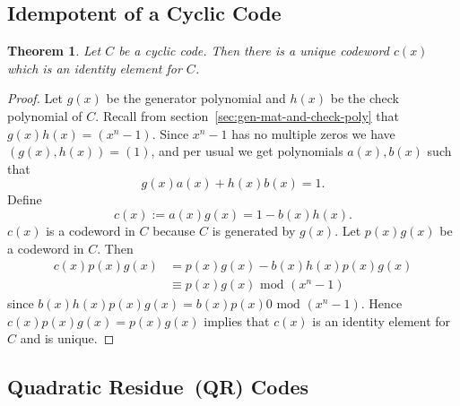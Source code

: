 \documentclass{article}
\renewcommand{\mod}{\text{ mod }}
\renewcommand{\=}{\equiv}
\theoremstyle{plain}
\newtheorem{thm}{Theorem}[subsection]
\theoremstyle{definition}
\begin{document}
\subsection{Idempotent of a Cyclic Code}

\begin{thm}
Let $C$ be a cyclic code.
Then there is a unique codeword $c(x)$ which is an identity element for $C$.
\end{thm}
\begin{proof}
Let $g(x)$ be the generator polynomial and $h(x)$ be the check polynomial of $C$.
Recall from section~\ref{sec:gen-mat-and-check-poly} that $g(x) h(x) = (x^n - 1)$.
Since $x^n - 1$ has no multiple zeros we have $(g(x), h(x)) = (1)$, and per usual we get
polynomials $a(x), b(x)$ such that
$$ g(x) a(x) + h(x) b(x) = 1. $$
Define
$$ c(x) := a(x) g(x) = 1 - b(x) h(x). $$
$c(x)$ is a codeword in $C$ because $C$ is generated by $g(x)$.
Let $p(x) g(x)$ be a codeword in $C$.
Then
\begin{align*}
c(x) p(x) g(x)
&= p(x) g(x) - b(x) h(x) p(x) g(x) \\
&\= p(x) g(x) \mod (x^n - 1)
\end{align*}
since $b(x) h(x) p(x) g(x) = b(x) p(x) 0 \mod (x^n - 1)$.
Hence $c(x) p(x) g(x) = p(x) g(x)$ implies that $c(x)$ is an identity element for $C$ and is unique.


\end{proof}



\subsection{Quadratic Residue (QR) Codes}
\end{document}
